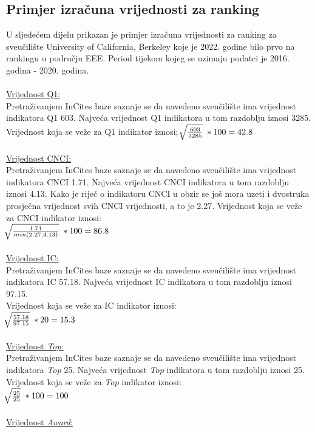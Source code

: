 \documentclass[times, utf8, zavrsni]{fer}
\begin{document}
\subsection{Primjer izračuna vrijednosti za ranking}
\label{racunanje}
U sljedećem dijelu prikazan je primjer izračuna vrijednosti za ranking za sveučilište University of California, Berkeley koje je 2022. godine bilo prvo na rankingu u području EEE.
Period tijekom kojeg se uzimaju podatci je 2016. godina - 2020. godina.
\\
\\ \underline{Vrijednost Q1:} 
\\ Pretraživanjem InCites baze saznaje se da navedeno sveučilište ima vrijednost indikatora Q1 603. Najveća vrijednost Q1 indikatora u tom razdoblju iznosi 3285.
Vrijednost koja se veže za Q1 indikator iznosi;  \; $\sqrt[\leftroot{-2}]{\frac{603}{3285}} \; * 100 = 42.8$
\\
\\ \underline{Vrijednost CNCI:} 
\\ Pretraživanjem InCites baze saznaje se da navedeno sveučilište ima vrijednost indikatora CNCI 1.71. Najveća vrijednost CNCI indikatora u tom razdoblju iznosi 4.13.
Kako je riječ o indikatoru CNCI u obzir se još mora uzeti i dvostruka prosječna vrijednost svih CNCI vrijednosti, a to je 2.27.
Vrijednost koja se veže za CNCI indikator iznosi: \; \\ $\sqrt[\leftroot{-2}]{\frac{1.71}{min(2.27, 4.13)}} \; * 100 = 86.8$
\\
\\ \underline{Vrijednost IC:} 
\\ Pretraživanjem InCites baze saznaje se da navedeno sveučilište ima vrijednost indikatora IC 57.18. Najveća vrijednost IC indikatora u tom razdoblju iznosi 97.15.
\\Vrijednost koja se veže za IC indikator iznosi: \; \\ $\sqrt[\leftroot{-2}]{\frac{57.18}{97.15}} \; * 20 = 15.3$
\\
\\ \underline{Vrijednost \emph{Top}:} 
\\ Pretraživanjem InCites baze saznaje se da navedeno sveučilište ima vrijednost indikatora \emph{Top} 25. Najveća vrijednost \emph{Top} indikatora u tom razdoblju iznosi 25.
Vrijednost koja se veže za \emph{Top} indikator iznosi: \; \\ $\sqrt[\leftroot{-2}]{\frac{25}{25}} \; * 100 = 100$
\\
\\ \underline{Vrijednost \emph{Award}:} 
\end{document}
